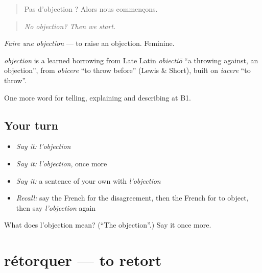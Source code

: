 \begin{quote}
Pas d'objection ? Alors nous commençons.
\end{quote}

\begin{quote}
\emph{No objection? Then we start.}
\end{quote}

\emph{Faire une objection} — to raise an objection. Feminine.

\begin{cousinweb}
\emph{objection} is a learned borrowing from Late Latin \emph{obiectiō} \textquotedblleft{}a throwing against, an objection\textquotedblright{}, from \emph{obicere} \textquotedblleft{}to throw before\textquotedblright{} (Lewis \& Short), built on \emph{iacere} \textquotedblleft{}to throw\textquotedblright{}.
\end{cousinweb}

\begin{grammarlens}[title={What you've built}]
One more word for telling, explaining and describing at B1.
\end{grammarlens}

\subsection*{Your turn}
\begin{itemize}
\raggedright
  \item \emph{Say it:} \emph{l'objection}
  \item \emph{Say it:} \emph{l'objection}, once more
  \item \emph{Say it:} a sentence of your own with \emph{l'objection}
  \item \emph{Recall:} say the French for the disagreement, then the French for to object, then say \emph{l'objection} again
\end{itemize}

\begin{tcolorbox}[breakable,colback=teal!4,colframe=teal!35!black,title={Before you move on}]
What does l'objection mean? (\textquotedblleft{}The objection\textquotedblright{}.) Say it once more.
\end{tcolorbox}
\section[rétorquer]{rétorquer — to retort}

\label{lesson:FR-C336-retorquer}




